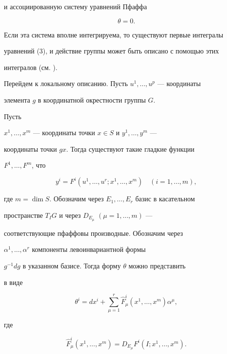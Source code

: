 и ассоциированную систему уравнений Пфаффа


\begin{equation}


\theta = 0.


\end{equation}


Если эта система вполне интегрируема, то существуют первые интегралы


уравнений (3), и действие группы может быть описано с помощью этих


интегралов (см. \cite{1}).





Перейдем к локальному описанию. Пусть $u^1,\dotsc,u^p$ --- координаты


элемента $g$ в координатной окрестности группы $G$.


Пусть


$x^1,\dotsc,x^m$ --- координаты точки $x \in S$ и $y^1,\dotsc,y^m$ ---


координаты точки $gx$. Тогда существуют такие гладкие функции


$F^1,\dotsc,F^m$, что


$$


y^i = F^i (u^1,\dotsc,u^r; x^1,\dotsc,x^m)\quad (i = 1,\dotsc,m),


$$


где $m = \dim S$. Обозначим через $E_1,\dotsc,E_r$ базис в касательном


пространстве $T_I G$ и через $D_{E_\mu}$ $(\mu = 1,\dotsc,m)$ ---


соответствующие пфаффовы производные. Обозначим через


$\alpha^1,\dotsc,\alpha^r$ компоненты левоинвариантной формы


$g^{-1}dg$ в указанном базисе. Тогда форму $\theta$ можно представить


в виде


\begin{equation}


\theta^i = dx^i + \sum_{\mu = 1}^r {\widehat F}^i_\mu (x^1,\dotsc,x^m)


{\alpha}^\mu,


\end{equation}


где


$$


{\widehat F}^i_\mu (x^1,\dotsc,x^m) = D_{E_\mu}F^i (I; x^1,\dotsc,x^m).


$$


